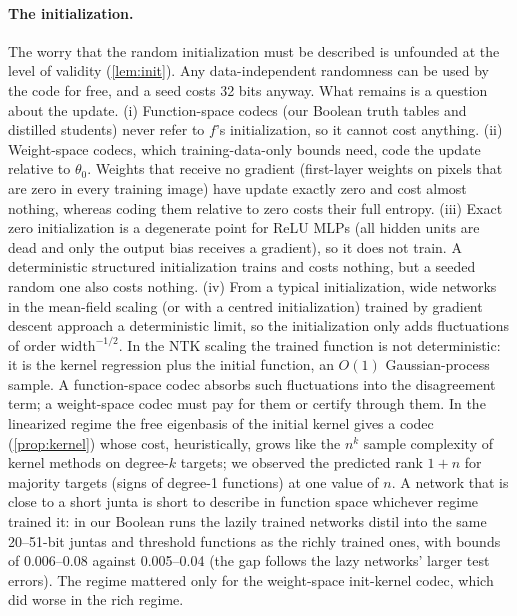 \paragraph{The initialization.} The worry that the random initialization must be described is unfounded at the level of validity (\cref{lem:init}). Any data-independent randomness can be used by the code for free, and a seed costs 32 bits anyway. What remains is a question about the update. (i) Function-space codecs (our Boolean truth tables and distilled students) never refer to $f$'s initialization, so it cannot cost anything. (ii) Weight-space codecs, which training-data-only bounds need, code the update relative to $\theta_0$. Weights that receive no gradient (first-layer weights on pixels that are zero in every training image) have update exactly zero and cost almost nothing, whereas coding them relative to zero costs their full entropy. (iii) Exact zero initialization is a degenerate point for ReLU MLPs (all hidden units are dead and only the output bias receives a gradient), so it does not train. A deterministic structured initialization trains and costs nothing, but a seeded random one also costs nothing. (iv) From a typical initialization, wide networks in the mean-field scaling (or with a centred initialization) trained by gradient descent approach a deterministic limit, so the initialization only adds fluctuations of order $\mathrm{width}^{-1/2}$. In the NTK scaling the trained function is not deterministic: it is the kernel regression plus the initial function, an $O(1)$ Gaussian-process sample. A function-space codec absorbs such fluctuations into the disagreement term; a weight-space codec must pay for them or certify through them. In the linearized regime the free eigenbasis of the initial kernel gives a codec (\cref{prop:kernel}) whose cost, heuristically, grows like the $n^k$ sample complexity of kernel methods on degree-$k$ targets; we observed the predicted rank $1+n$ for majority targets (signs of degree-1 functions) at one value of $n$. A network that is close to a short junta is short to describe in function space whichever regime trained it: in our Boolean runs the lazily trained networks distil into the same 20--51-bit juntas and threshold functions as the richly trained ones, with bounds of 0.006--0.08 against 0.005--0.04 (the gap follows the lazy networks' larger test errors). The regime mattered only for the weight-space init-kernel codec, which did worse in the rich regime.

